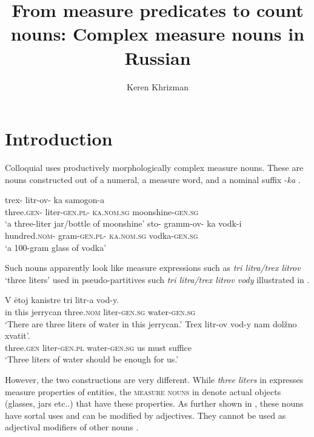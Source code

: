 \documentclass[output=paper,
colorlinks,
citecolor=brown,
newtxmath
]{langscibook}
\author{Keren Khrizman\affiliation{Bar-Ilan University}}
\title{From measure predicates to count nouns: Complex measure nouns in Russian}
\begin{document}
\maketitle

%


\section{Introduction}
Colloquial  uses productively morphologically complex measure nouns. These are nouns constructed out of a numeral, a measure word, and a nominal suffix -\textit{ka} .

\ea\label{ex:khrizmann:1}
    \ea\label{ex:khrizmann:1a} \gll trex- litr-ov- ka samogon-a\\
    three.\textsc{gen}- liter-\textsc{gen.pl}- \textsc{ka.nom.sg} moonshine-\textsc{gen.sg}\\
    \glt `a three-liter jar/bottle of moonshine'
    \ex\label{ex:khrizmann:1b} \gll sto- gramm-ov- ka vodk-i\\
    hundred.\textsc{nom}- gram-\textsc{gen.pl}- \textsc{ka.nom.sg} vodka-\textsc{gen.sg}\\
    \glt `a 100-gram glass of vodka'
\z\z

\noindent Such nouns apparently look like measure expressions such as \textit{tri litra/trex litrov} `three liters' used in pseudo-partitives such \textit{tri litra/trex litrov vody} illustrated in .

\ea\label{ex:khrizmann:2}
    \ea\label{ex:khrizmann:2a} \gll V ėtoj kanistre tri litr-a vod-y.\\
    in this jerrycan three.\textsc{nom} liter-\textsc{gen.sg} water-\textsc{gen.sg}\\
    \glt `There are three liters of water in this jerrycan.'
    \ex\label{ex:khrizmann:2b} \gll Trex litr-ov vod-y nam dolžno xvatit’.\\
    three.\textsc{gen} liter-\textsc{gen.pl} water-\textsc{gen.sg} us must suffice\\
    \glt `Three liters of water should be enough for us.'
\z\z

\noindent However, the two constructions are very different. While \textit{three liters} in  expresses measure properties of entities, the \textsc{measure nouns} in  denote actual objects (glasses, jars etc..) that have these properties. As further shown in , these nouns have sortal uses and can be modified by adjectives. They cannot be used as adjectival modifiers of other nouns .
\end{document}
